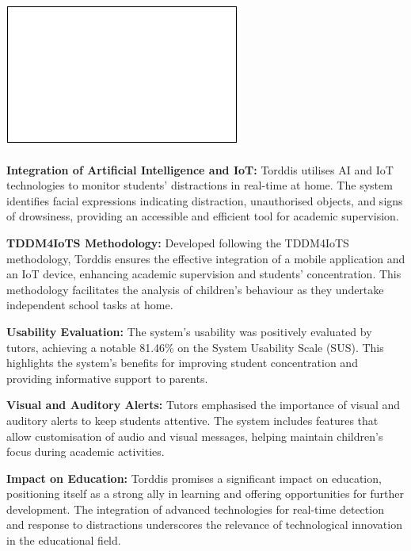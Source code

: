 \documentclass[a4paper,fleqn]{cas-sc}
\begin{document}
	\begin{graphicalabstract}
	\includegraphics{figs/cas-grabs.pdf}
	\end{graphicalabstract}
	
	\begin{highlights}
		\item \textbf{Integration of Artificial Intelligence and IoT:} Torddis utilises AI and IoT technologies to monitor students' distractions in real-time at home. The system identifies facial expressions indicating distraction, unauthorised objects, and signs of drowsiness, providing an accessible and efficient tool for academic supervision.
		\item \textbf{TDDM4IoTS Methodology:} Developed following the TDDM4IoTS methodology, Torddis ensures the effective integration of a mobile application and an IoT device, enhancing academic supervision and students' concentration. This methodology facilitates the analysis of children's behaviour as they undertake independent school tasks at home.
		\item \textbf{Usability Evaluation:} The system's usability was positively evaluated by tutors, achieving a notable 81.46\% on the System Usability Scale (SUS). This highlights the system's benefits for improving student concentration and providing informative support to parents.
		\item \textbf{Visual and Auditory Alerts:} Tutors emphasised the importance of visual and auditory alerts to keep students attentive. The system includes features that allow customisation of audio and visual messages, helping maintain children's focus during academic activities.
		\item \textbf{Impact on Education:} Torddis promises a significant impact on education, positioning itself as a strong ally in learning and offering opportunities for further development. The integration of advanced technologies for real-time detection and response to distractions underscores the relevance of technological innovation in the educational field.
	\end{highlights}
\end{document}
